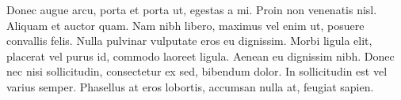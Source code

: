Donec augue arcu, porta et porta ut, egestas a mi. Proin non venenatis nisl. Aliquam et auctor quam. Nam nibh libero, maximus vel enim ut, posuere convallis felis. Nulla pulvinar vulputate eros eu dignissim. Morbi ligula elit, placerat vel purus id, commodo laoreet ligula. Aenean eu dignissim nibh. Donec nec nisi sollicitudin, consectetur ex sed, bibendum dolor. In sollicitudin est vel varius semper. Phasellus at eros lobortis, accumsan nulla at, feugiat sapien.
